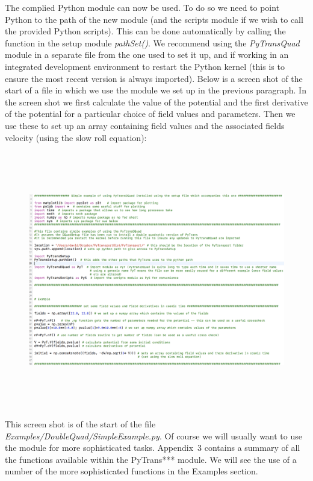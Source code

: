 \documentclass[10pt,
amsmath,amssymb,
aps,prd,nofootinbib,eqsecnum,a4paper]{revtex4}
\begin{document}
The complied Python module can now be used. To do so we need to point Python to the path of the new module (and 
the scripts module if we wish to call the provided Python scripts). This can be done automatically 
by calling the function in the setup module {\it pathSet()}. We recommend using the {\it PyTransQuad} 
module in a separate file from the one used to set it up, and if working in an integrated development environment to restart the Python kernel (this is to ensure the most recent version is always imported). Below is a screen shot of the start of a file in which we use the module we set up in the previous paragraph. In the screen shot we first calculate the value of the potential and the first derivative of the potential 
for a particular choice of field values and parameters. Then we use 
these to set up an array containing field values and the associated fields velocity (using the slow roll
equation):


\begin{figure}[H]
\centering
\includegraphics[width=18cm, height=11.2cm]{shot2b}
\end{figure}

\noindent This screen shot is of the start of the file {\it Examples/DoubleQuad/SimpleExample.py}. Of course we will usually want 
to use the module for more sophisticated tasks. Appendix~3 contains a summary 
of all the functions  available within the { PyTrans***} module. We will see the use of a number of the more sophisticated functions in the Examples section.
\end{document}
